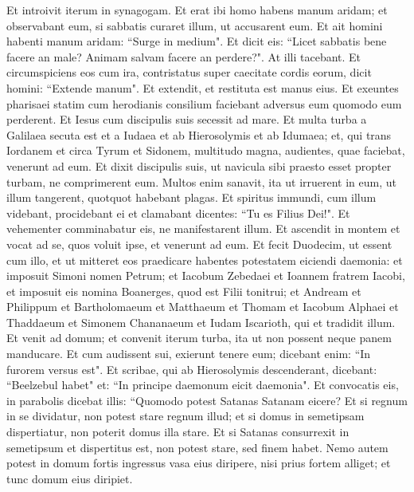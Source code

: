 \begin{biblechapter}  
\verse Et introivit iterum in synagogam. Et erat ibi homo habens manum aridam; 
\verse et observabant eum, si sabbatis curaret illum, ut accusarent eum. 
\verse Et ait homini habenti manum aridam: “Surge in medium". 
\verse Et dicit eis: “Licet sabbatis bene facere an male? Animam salvam facere an perdere?". At illi tacebant. 
\verse Et circumspiciens eos cum ira, contristatus super caecitate cordis eorum, dicit homini: “Extende manum". Et extendit, et restituta est manus eius. 
\verse Et exeuntes pharisaei statim cum herodianis consilium faciebant adversus eum quomodo eum perderent. 
\verse Et Iesus cum discipulis suis secessit ad mare. Et multa turba a Galilaea secuta est et a Iudaea 
\verse et ab Hierosolymis et ab Idumaea; et, qui trans Iordanem et circa Tyrum et Sidonem, multitudo magna, audientes, quae faciebat, venerunt ad eum. 
\verse Et dixit discipulis suis, ut navicula sibi praesto esset propter turbam, ne comprimerent eum. 
\verse Multos enim sanavit, ita ut irruerent in eum, ut illum tangerent, quotquot habebant plagas. 
\verse Et spiritus immundi, cum illum videbant, procidebant ei et clamabant dicentes: “Tu es Filius Dei!". 
\verse Et vehementer comminabatur eis, ne manifestarent illum. 
\verse Et ascendit in montem et vocat ad se, quos voluit ipse, et venerunt ad eum. 
\verse Et fecit Duodecim, ut essent cum illo, et ut mitteret eos praedicare  
\verse habentes potestatem eiciendi daemonia: 
\verse et imposuit Simoni nomen Petrum; 
\verse et Iacobum Zebedaei et Ioannem fratrem Iacobi, et imposuit eis nomina Boanerges, quod est Filii tonitrui; 
\verse et Andream et Philippum et Bartholomaeum et Matthaeum et Thomam et Iacobum Alphaei et Thaddaeum et Simonem Chananaeum 
\verse et Iudam Iscarioth, qui et tradidit illum. 
\verse Et venit ad domum; et convenit iterum turba, ita ut non possent neque panem manducare. 
\verse Et cum audissent sui, exierunt tenere eum; dicebant enim: “In furorem versus est". 
\verse Et scribae, qui ab Hierosolymis descenderant, dicebant: “Beelzebul habet" et: “In principe daemonum eicit daemonia". 
\verse Et convocatis eis, in parabolis dicebat illis: “Quomodo potest Satanas Satanam eicere? 
\verse Et si regnum in se dividatur, non potest stare regnum illud; 
\verse et si domus in semetipsam dispertiatur, non poterit domus illa stare. 
\verse Et si Satanas consurrexit in semetipsum et dispertitus est, non potest stare, sed finem habet. 
\verse Nemo autem potest in domum fortis ingressus vasa eius diripere, nisi prius fortem alliget; et tunc domum eius diripiet. 

\end{biblechapter}

